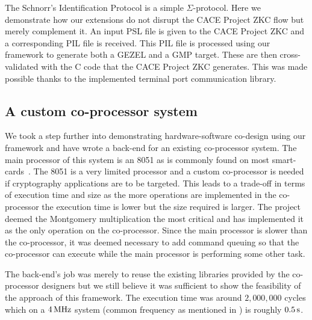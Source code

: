 
The Schnorr's Identification Protocol is a simple
$\Sigma$-protocol. Here we demonstrate how our extensions do not
disrupt the CACE Project ZKC flow but merely complement it. An input
PSL file is given to the CACE Project ZKC and a corresponding PIL file
is received. This PIL file is processed using our framework to
generate both a GEZEL and a GMP target. These are then cross-validated
with the C code that the CACE Project ZKC generates. This was made
possible thanks to the implemented terminal port communication
library.

\subsection{A custom co-processor system}

We took a step further into demonstrating hardware-software co-design
using our framework and have wrote a back-end for an existing
co-processor system. The main processor of this system is an 8051 as
is commonly found on most
smart-cards~\cite{smartcard_crypto_coprocs2}. The 8051 is a very
limited processor and a custom co-processor is needed if cryptography
applications are to be targeted. This leads to a trade-off in terms of
execution time and size as the more operations are implemented in the
co-processor the execution time is lower but the size required is
larger. The project deemed the Montgomery multiplication the most
critical and has implemented it as the only operation on the
co-processor. Since the main processor is slower than the
co-processor, it was deemed necessary to add command queuing so that
the co-processor can execute while the main processor is performing
some other task.

The back-end's job was merely to reuse the existing libraries provided
by the co-processor designers but we still believe it was sufficient
to show the feasibility of the approach of this framework. The
execution time was around $2,000,000$ cycles which on a
$\unit[4]{MHz}$ system (common frequency as mentioned in
\cite{smartcard_crypto_coprocs2}) is roughly $\unit[0.5]{s}$.

